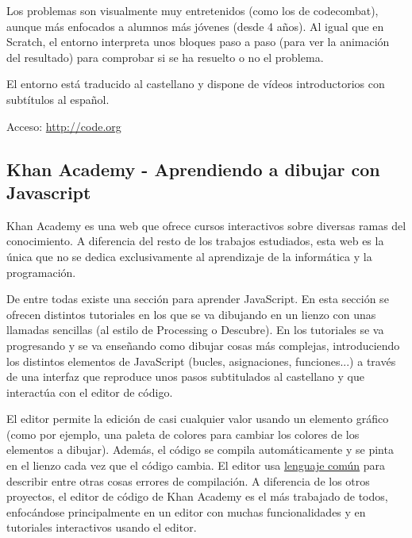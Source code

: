 \documentclass{report}
\begin{document}
	
	\vspace{10px}

	Los problemas son visualmente muy entretenidos (como los de codecombat), aunque más enfocados a alumnos más jóvenes (desde 4 años). Al igual que en Scratch, el entorno interpreta unos bloques paso a paso (para ver la animación del resultado) para comprobar si se ha resuelto o no el problema. 
	
	\vspace{10px}
	
	El entorno está traducido al castellano y dispone de vídeos introductorios con subtítulos al español.
	
	\vspace{10px}
	
	Acceso: \url{http://code.org}
	
	\subsection{Khan Academy - Aprendiendo a dibujar con Javascript}
	
	Khan Academy es una web que ofrece cursos interactivos sobre diversas ramas del conocimiento. A diferencia del resto de los trabajos estudiados, esta web es la única que no se dedica exclusivamente al aprendizaje de la informática y la programación.
	
	De entre todas existe una sección para aprender JavaScript. En esta sección se ofrecen distintos tutoriales en los que se va dibujando en un lienzo con unas llamadas sencillas (al estilo de Processing o Descubre). En los tutoriales se va progresando y se va enseñando como dibujar cosas más complejas, introduciendo los distintos elementos de JavaScript (bucles, asignaciones, funciones...) a través de una interfaz que reproduce unos pasos subtitulados al castellano y que interactúa con el editor de código.
		
	\vspace{10px}
	
	El editor permite la edición de casi cualquier valor usando un elemento gráfico (como por ejemplo, una paleta de colores para cambiar los colores de los elementos a dibujar). Además, el código se compila automáticamente y se pinta en el lienzo cada vez que el código cambia. El editor usa \hyperref[app:d]{lenguaje común} para describir entre otras cosas errores de compilación. A diferencia de los otros proyectos, el editor de código de Khan Academy es el más trabajado de todos, enfocándose principalmente en un editor con muchas funcionalidades y en tutoriales interactivos usando el editor.
	
\end{document}
